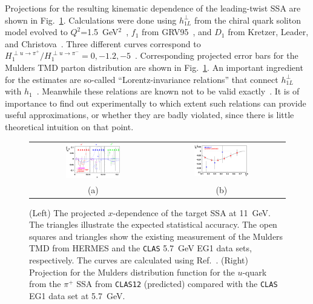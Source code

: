 Projections for the resulting kinematic dependence of the leading-twist SSA  
are shown in Fig.~\ref{fig:aul11.sin2}.  Calculations were done using 
$h_{1L}^\perp$ from the chiral quark soliton model evolved to 
$Q^2$=1.5~GeV$^2$~\cite{Efremov:2002ut}, $f_1$ from GRV95~\cite{Gluck:1995yr}, 
and $D_1$ from Kretzer, Leader, and Christova~\cite{Kretzer:2001pz}. Three 
different curves correspond to $H_1^{\perp u\rightarrow \pi^+}/
H_1^{\perp u\rightarrow \pi^-}=0,-1.2,-5$~\cite{Efremov:2004hz}. Corresponding 
projected error bars for the Mulders TMD parton distribution are shown
in Fig.~\ref{fig:aul11.sin2}.  An important ingredient for the estimates are 
so-called ``Lorentz-invariance relations'' that connect $h_{1L}^{\perp}$ with 
$h_1$~\cite{Mulders:1995dh}.  Meanwhile these relations are known not to be 
valid exactly~\cite{Goeke:2003az,Goeke:2005hb}.  It is of importance to find
out experimentally to which extent such relations can provide useful 
approximations, or whether they are badly violated, since there is little 
theoretical intuition on that point.

\begin{figure}
\vspace{-2.0cm}
\begin{tabular}{cc}
\includegraphics[height=.4\textheight,width=0.45\textwidth]{../sidis/aul11.sin2.eps}
&
\includegraphics[height=.31\textheight,width=0.45\textwidth]{../sidis/h1lu11.eps}
\\
(a) & (b)
\end{tabular}
\caption{\small{(Left) The projected $x$-dependence of the target SSA at 
11~GeV.  The triangles illustrate the expected statistical accuracy.  The open 
squares and triangles show the existing measurement of the Mulders TMD from 
HERMES and the {\tt CLAS} 5.7~GeV EG1 data sets, respectively.  The curves 
are calculated using Ref.~\cite{Efremov:2004hz}. (Right) Projection for the
Mulders distribution function for the $u$-quark from the $\pi^+$ SSA from 
{\tt CLAS12} (predicted) compared with the {\tt CLAS} EG1 data set at 
5.7~GeV.}}
\label{fig:aul11.sin2}
\end{figure}

